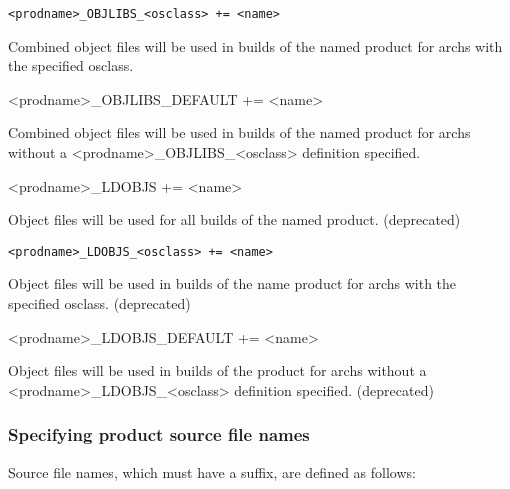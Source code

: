 \begin{description}\item \verb|<prodname>_OBJLIBS_<osclass> += <name>| 

\end{description}Combined object files will be used in builds of the named product for archs with the specified osclass.

\begin{description}\item \textless{}prodname\textgreater{}\_OBJLIBS\_DEFAULT += \textless{}name\textgreater{}

\end{description}Combined object files will be used in builds of the named product for archs without a 
\textless{}prodname\textgreater{}\_OBJLIBS\_\textless{}osclass\textgreater{} definition specified.



\begin{description}\item \textless{}prodname\textgreater{}\_LDOBJS += \textless{}name\textgreater{}

\end{description}Object files will be used for all builds of the named product. (deprecated)

\begin{description}\item \verb|<prodname>_LDOBJS_<osclass> += <name>| 

\end{description}Object files will be used in builds of the name product for archs with the specified osclass. (deprecated)

\begin{description}\item \textless{}prodname\textgreater{}\_LDOBJS\_DEFAULT += \textless{}name\textgreater{}

\end{description}Object files will be used in builds of the product for archs without a \textless{}prodname\textgreater{}\_LDOBJS\_\textless{}osclass\textgreater{} 
definition specified. (deprecated)

\subsubsection{Specifying product source file names}

Source file names, which must have a suffix, are defined as follows:

